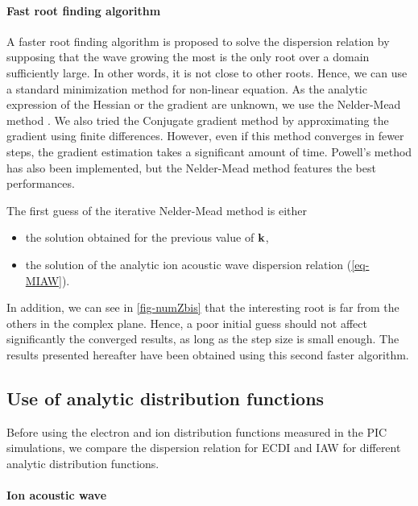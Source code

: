   \paragraph{Fast root finding algorithm\\}
    A faster root finding algorithm is proposed to solve the dispersion relation by supposing that the wave growing the most is the only root over a domain sufficiently large.
    In other words, it is not close to other roots.
    Hence, we can use a standard minimization method for non-linear equation.
    As the analytic expression of the Hessian or the gradient are unknown, we use the Nelder-Mead method \citep{mckinnon1998}.
    We also tried the Conjugate gradient method by approximating the gradient using finite differences. 
    However, even if this method converges in fewer steps, the gradient estimation takes a significant amount of time.
    Powell's method \citep{powell1964} has also been implemented, but the Nelder-Mead method features the best performances.
    
    The first guess of the iterative Nelder-Mead method is either 
    \begin{itemize}
      \item the solution obtained for the previous value of ${\mathbf k}$, 
      \item the solution of the analytic ion acoustic wave dispersion relation (\cref{eq-MIAW}).
    \end{itemize}
    In addition, we can see in \cref{fig-numZbis} that the interesting root is far from the others in the complex plane.
    Hence, a poor initial guess should not affect significantly the converged results, as long as the step size is small enough.
    The results presented hereafter have been obtained using this second faster algorithm.
    

    \FloatBarrier

\subsection{Use of analytic distribution functions} \label{subsec-DRimpact}
  Before using the electron and ion distribution functions measured in the \ac{PIC} simulations, we compare the dispersion relation for \ac{ECDI} and \ac{IAW} for different analytic distribution functions.
  
  \paragraph{Ion acoustic wave\\}
  
